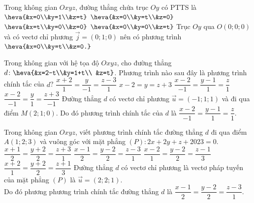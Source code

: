\begin{ex}%
	Trong không gian $O x y z$, đường thẳng chứa trục $O y$ có PTTS là 
	\choice 
	{$\heva{&x=0\\&y=1\\&z=t}$}
		{\True $\heva{&x=0\\&y=t\\&z=0}$}
			{$\heva{&x=t\\&y=0\\&z=0}$}
				{$\heva{&x=0\\&y=0\\&z=t}$}
					\loigiai 
					{
		Trục $O y$ qua $O(0;0;0)$ và có vectơ chỉ phương $\vec{j}=(0;1;0)$ nên có phương trình $\heva{&x=0\\&y=t\\&z=0.}$
					}
\end{ex}

\begin{ex}%
	Trong không gian với hệ tọa độ $O x y z$, cho đường thẳng $d\colon\heva{&x=2-t\\&y=1+t\\ &z=t}$. Phương trình nào sau đây là phương trình chính tắc của $d$?
		\choice 
		{$\dfrac{x+2}{1}=\dfrac{y}{-1}=\dfrac{z-3}{1}$}
		{$x-2=y=z+3$}
		{\True $\dfrac{x-2}{-1}=\dfrac{y-1}{1}=\dfrac{z}{1}$}
		{$\dfrac{x-2}{-1}=\dfrac{y}{1}=\dfrac{z+3}{-1}$}
		\loigiai 
		{
Đường thẳng $d$ có vectơ chỉ phương $\vec{u}=(-1;1;1)$ và đi qua điểm $M(2;1;0)$. Do đó phương trình chính tắc của $d$ là $\dfrac{x-2}{-1}=\dfrac{y-1}{1}=\dfrac{z}{1}$.		
		}
\end{ex}

\begin{ex}%
	Trong không gian $O x y z$, viết phương trình chính tắc đường thẳng $d$ đi qua điểm $A(1;2;3)$ và vuông góc với mặt phẳng $(P)\colon 2x+2y+z+2023=0$.
	\choice 
	{$\dfrac{x+1}{2}=\dfrac{y+2}{2}=\dfrac{z+3}{1}$}
	{\True $\dfrac{x-1}{2}=\dfrac{y-2}{2}=\dfrac{z-3}{1}$}
	{$\dfrac{x-2}{1}=\dfrac{y-2}{2}=\dfrac{z-1}{3}$}
	{$\dfrac{x+2}{1}=\dfrac{y+2}{2}=\dfrac{z+1}{3}$}
	\loigiai 
	{
Đường thẳng $d$ có vectơ chỉ phương là vectơ pháp tuyến của mặt phẳng $(P)$ là $\vec{u}=(2;2;1)$.\\
Do đó phương phương trình chính tắc đường thẳng $d$ là $\dfrac{x-1}{2}=\dfrac{y-2}{2}=\dfrac{z-3}{1}$.
	}
\end{ex}

